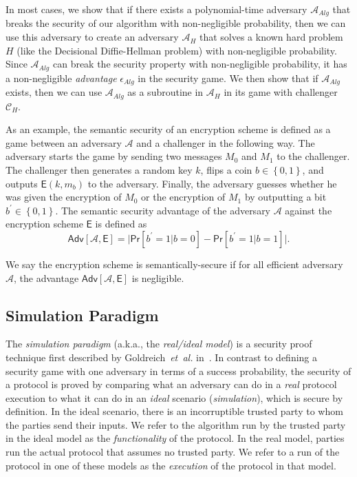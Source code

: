 \documentclass[11pt]{article}
\theoremstyle{plain}
\begin{document}
In most cases, we show that if there exists a polynomial-time adversary
$\mathcal{A}_{Alg}$ that breaks the security of our algorithm with
non-negligible probability, then we can use this adversary to create
an adversary $\mathcal{A}_{H}$ that solves a known hard problem $H$
(like the Decisional Diffie-Hellman problem) with non-negligible probability.
Since $\mathcal{A}_{Alg}$ can break the security property with non-negligible
probability, it has a non-negligible \emph{advantage} $\epsilon_{Alg}$
in the security game. We then show that if $\mathcal{A}_{Alg}$ exists,
then we can use $\mathcal{A}_{Alg}$ as a subroutine in $\mathcal{A}_{H}$
in its game with challenger $\mathcal{C}_{H}$.

As an example, the semantic security of an encryption scheme is defined
as a game between an adversary $\mathcal{A}$ and a challenger in
the following way. The adversary starts the game by sending two messages
$M_{0}$ and $M_{1}$ to the challenger. The challenger then generates
a random key $k$, flips a coin $b\in\left\{ 0,1\right\} $, and outputs
$\mathsf{E}(k,m_{b})$ to the adversary. Finally, the adversary guesses
whether he was given the encryption of $M_{0}$ or the encryption
of $M_{1}$ by outputting a bit $b^{\prime}\in\left\{ 0,1\right\} $.
The semantic security advantage\emph{ }of the adversary $\mathcal{A}$
against the encryption scheme $\mathsf{E}$ is defined as 
\[
\mathsf{Adv}[\mathcal{A},\mathsf{E}]=\big|\mathsf{Pr}[b^{\prime}=1|b=0]-\mathsf{Pr}[b^{\prime}=1|b=1]\big|.
\]

We say the encryption scheme is semantically-secure if for all efficient
adversary $\mathcal{A}$, the advantage $\mathsf{Adv}[\mathcal{A},\mathsf{E}]$
is negligible.

\subsection{Simulation Paradigm}

The \emph{simulation paradigm }(a.k.a., the \emph{real/ideal model})
is a security proof technique first described by Goldreich~\emph{et~al.}
in~\cite{Goldreich:1987:PAM:28395.28420}. In contrast to defining
a security game with one adversary in terms of a success probability,
the security of a protocol is proved by comparing what an adversary
can do in a \emph{real} protocol execution to what it can do in an
\emph{ideal} scenario (\emph{simulation}), which is secure by definition.
In the ideal scenario, there is an incorruptible trusted party to
whom the parties send their inputs. We refer to the algorithm run
by the trusted party in the ideal model as the \emph{functionality}
of the protocol. In the real model, parties run the actual protocol
that assumes no trusted party. We refer to a run of the protocol in
one of these models as the \emph{execution} of the protocol in that
model.
\end{document}
